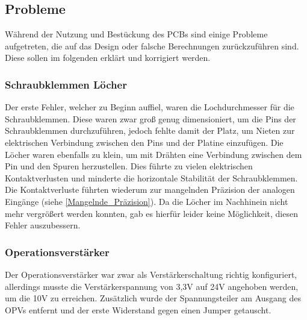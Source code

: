 \subsection{Probleme}
Während der Nutzung und Bestückung des \ac{PCB}s sind einige Probleme aufgetreten, die auf das Design oder falsche Berechnungen zurückzuführen sind. Diese sollen im folgenden erklärt und korrigiert werden.
\subsubsection{Schraubklemmen Löcher}
Der erste Fehler, welcher zu Beginn auffiel, waren die Lochdurchmesser für die Schraubklemmen. Diese waren zwar groß genug dimensioniert, um die Pins der Schraubklemmen durchzuführen, jedoch fehlte damit der Platz, um Nieten zur elektrischen Verbindung zwischen den Pins und der Platine einzufügen. Die Löcher waren ebenfalls zu klein, um mit Drähten eine Verbindung zwischen dem Pin und den Spuren herzustellen. Dies führte zu vielen elektrischen Kontaktverlusten und minderte die horizontale Stabilität der Schraubklemmen. Die Kontaktverluste führten wiederum zur mangelnden Präzision der analogen Eingänge (siehe \autoref{Mangelnde_Präzision}). Da die Löcher im Nachhinein nicht mehr vergrößert werden konnten, gab es hierfür leider keine Möglichkeit, diesen Fehler auszubessern.
\subsubsection{Operationsverstärker}
Der Operationsverstärker war zwar als Verstärkerschaltung richtig konfiguriert, allerdings musste die Verstärkerspannung von 3,3V auf 24V angehoben werden, um die 10V zu erreichen. Zusätzlich wurde der Spannungsteiler am Ausgang des OPVs entfernt und der erste Widerstand gegen einen Jumper getauscht.
